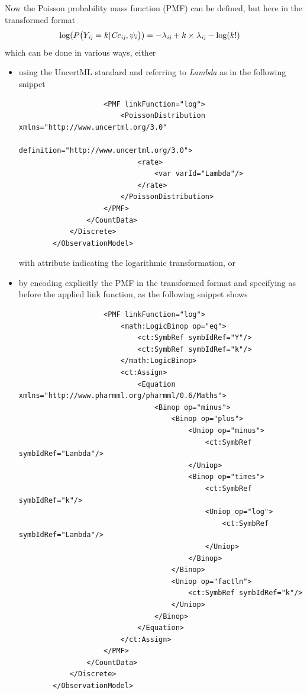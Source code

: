Now the Poisson probability mass function (PMF) can be defined, but here 
in the transformed format 
\begin{align}
\log(P\big(Y_{\mathit{ij}} & =k | \mathit{Cc}_{\mathit{ij}}, \psi_i\big)) =  -\lambda_{\mathit{ij}} +k\times \lambda_{\mathit{ij}} - \log(k!) \nonumber
\end{align}
which can be done in various ways, either
\begin{itemize}
\item
using the UncertML standard and referring to \emph{Lambda} as in the following snippet
\lstset{language=XML}
\begin{lstlisting}
                    <PMF linkFunction="log">
                        <PoissonDistribution xmlns="http://www.uncertml.org/3.0" 
                            definition="http://www.uncertml.org/3.0">
                            <rate>
                                <var varId="Lambda"/>
                            </rate>
                        </PoissonDistribution>
                    </PMF>
                </CountData>
            </Discrete>
        </ObservationModel>
\end{lstlisting}
with  attribute indicating the logarithmic transformation, or 
\item
by encoding explicitly the PMF in the transformed format and specifying as before
the applied link function, as the following snippet shows
\lstset{language=XML}
\begin{lstlisting}
                    <PMF linkFunction="log">
                        <math:LogicBinop op="eq">
                            <ct:SymbRef symbIdRef="Y"/>
                            <ct:SymbRef symbIdRef="k"/>
                        </math:LogicBinop>
                        <ct:Assign>
                            <Equation xmlns="http://www.pharmml.org/pharmml/0.6/Maths">
                                <Binop op="minus">
                                    <Binop op="plus">
                                        <Uniop op="minus">
                                            <ct:SymbRef symbIdRef="Lambda"/>
                                        </Uniop>
                                        <Binop op="times">
                                            <ct:SymbRef symbIdRef="k"/>
                                            <Uniop op="log">
                                                <ct:SymbRef symbIdRef="Lambda"/>
                                            </Uniop>
                                        </Binop>
                                    </Binop>
                                    <Uniop op="factln">
                                        <ct:SymbRef symbIdRef="k"/>
                                    </Uniop>
                                </Binop>
                            </Equation>
                        </ct:Assign>
                    </PMF>
                </CountData>
            </Discrete>
        </ObservationModel> 
\end{lstlisting}
\end{itemize}

